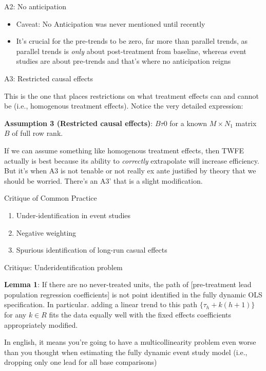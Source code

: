 \documentclass{beamer}
\begin{document}
\begin{frame}{A2: No anticipation}

\begin{itemize}
\item Caveat: No Anticipation was never mentioned until recently
\item It's crucial for the pre-trends to be zero, far more than parallel trends, as parallel trends is \emph{only} about post-treatment from baseline, whereas event studies are about pre-trends and that's where no anticipation reigns
\end{itemize}

\end{frame}


\begin{frame}{A3: Restricted causal effects}

This is the one that places restrictions on what treatment effects can and cannot be (i.e., homogenous treatment effects). Notice the very detailed expression:

\bigskip

\textbf{Assumption 3 (Restricted causal effects)}: $B\tau0$ for a known $M \times N_1$ matrix $B$ of full row rank. 

\bigskip

If we can assume something like homogenous treatment effects, then TWFE actually is best because its ability to \emph{correctly} extrapolate will increase efficiency. But it's when A3 is not tenable or not really ex ante justified by theory that we should be worried. There's an A3' that is a slight modification. 

\end{frame}


\begin{frame}{Critique of Common Practice}

\begin{enumerate}
\item Under-identification in event studies
\item Negative weighting
\item Spurious identification of long-run casual effects
\end{enumerate}

\end{frame}

\begin{frame}{Critique: Underidentification problem}


\textbf{Lemma 1}: If there are no never-treated units, the path of [pre-treatment lead population regression coefficients] is not point identified in the fully dynamic OLS specification.  In particular. adding a linear trend to this path $\{\tau_h + k(h+1) \}$ for any $k \in R$ fits the data equally well with the fixed effects coefficients appropriately modified.

\bigskip

In english, it means you're going to have a multicollinearity problem even worse than you thought when estimating the fully dynamic event study model (i.e., dropping only one lead for all base comparisons)

\end{frame}
\end{document}
